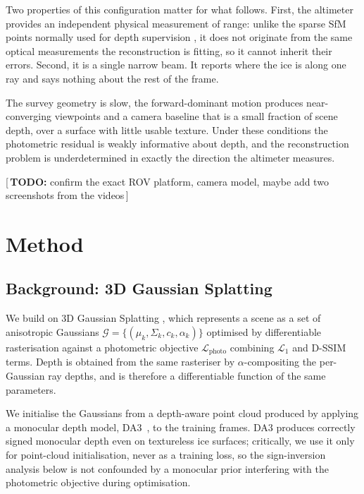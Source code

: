 \documentclass[conference]{IEEEtran}
\newif\ifdraftnotes\draftnotestrue
\newcommand{\needswork}[1]{%
  \ifdraftnotes\textcolor{red!75!black}{\small[\,\textbf{TODO:} #1\,]}\fi}
\begin{document}
Two properties of this configuration matter for what follows. First, the
altimeter provides an independent physical measurement of range: unlike
the sparse SfM points normally used for depth supervision
\cite{deng2022dsnerf}, it does not originate from the same optical
measurements the reconstruction is fitting, so it cannot inherit their errors.
Second, it is a single narrow beam. It reports where the ice is along one ray
and says nothing about the rest of the frame.

The survey geometry is slow, the forward-dominant motion produces near-converging viewpoints and
a camera baseline that is a small fraction of scene depth, over a surface with
little usable texture. Under these conditions the photometric residual is
weakly informative about depth, and the reconstruction problem is
underdetermined in exactly the direction the altimeter measures.

\needswork{confirm the exact ROV platform, camera model, maybe add two screenshots from the videos}
\section{Method}
\label{sec:method}

\subsection{Background: 3D Gaussian Splatting}
\label{sec:method-init}

We build on 3D Gaussian Splatting \cite{kerbl20233dgs}, which represents a
scene as a set of anisotropic Gaussians $\mathcal{G} = \{(\mu_k, \Sigma_k,
c_k, \alpha_k)\}$ optimised by differentiable rasterisation against a
photometric objective $\mathcal{L}_{\text{photo}}$ combining $\mathcal{L}_1$
and D-SSIM terms. Depth is obtained from the same rasteriser by
$\alpha$-compositing the per-Gaussian ray depths, and is therefore a
differentiable function of the same parameters.

We initialise the Gaussians from a depth-aware point cloud produced by
applying a monocular depth model, DA3~\cite{lin2025depth3recoveringvisual}, to the training
frames. DA3 produces correctly signed monocular depth even on textureless
ice surfaces; critically, we use it only for point-cloud
initialisation, never as a training loss, so the sign-inversion analysis
below is not confounded by a monocular prior interfering with the
photometric objective during optimisation.
\end{document}
